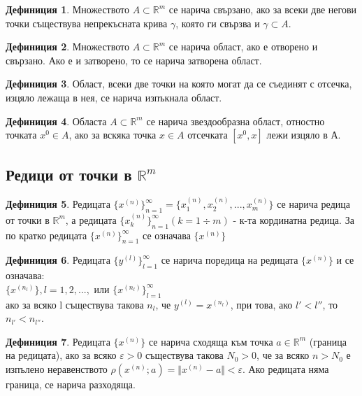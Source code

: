 \documentclass[a4paper,fleqn,12pt]{article}
\theoremstyle{definition}
\newtheorem{definition}{Дефиниция}[subsection]
\begin{document}
\begin{definition}
Множеството  $A \subset \mathbb{R}^m $ се нарича свързано,  ако за всеки две негови точки съществува непрекъсната крива $\gamma$, която ги свързва и $\gamma \subset A$.
\end{definition}

\begin{definition}
Множеството  $A \subset \mathbb{R}^m $ се нарича област, ако е отворено и свързано. Ако е и затворено, то се нарича затворена област. 
\end{definition}

\begin{definition}
Област, всеки две точки на която могат да се съединят с отсечка, изцяло лежаща в нея, се нарича изпъкнала област. 
\end{definition}

\begin{definition}
Областа $A \subset \mathbb{R}^m $ се нарича звездообразна област, отностно точката $x^0 \in A$, ако за вскяка точка $x \in A$ отсечката $[x^0,x]$ лежи изцяло в А. 
\end{definition}

\subsection{Редици от точки в $\mathbb{R}^m$}

\begin{definition}
Редицата $\{ x^{(n)} \}_{n = 1} ^ \infty = \{x_1 ^{(n)}, x_2 ^{(n)}, ... , x_m^{(n)}\} $ се нарича редица от точки в $\mathbb{R}^m$, а редицата $\{ x_k ^{(n)}\}_{n=1} ^ \infty ( k = 1 \div m) $ - к-та кординатна редица. За по кратко редицата $\{ x^{(n)} \}_{n = 1} ^ \infty$ се означава $\{ x^{(n)} \}$
\end{definition}

\begin{definition}
Редицата $\{ y^{(l)} \}_{l = 1} ^ \infty$ се нарича поредица на редицата $\{ x^{(n)} \}$ и се означава:\\
$\{ x^{(n_l)} \}, l = 1, 2, ..., $ или $\{ x^{(n_l)} \}_{l = 1} ^ \infty$\\
ако за всяко l съществува такова $n_l$, че $y^{(l)} = x^{(n_l)}$, при това, ако $l' < l'' $, то $n_{l'}<n_{l''}$.
\end{definition}

\begin{definition}
Редицата $\{ x^{(n)} \}$ се нарича сходяща към точка $a \in \mathbb{R}^m$ (граница на редицата), ако за всяко $\varepsilon > 0$ съществува такова $N_0 > 0$, че за всяко $n > N_0$ е изпълено неравенството $\rho(x^{(n)};a) = \Vert x^{(n)} - a \Vert < \varepsilon$. Ако редицата няма граница, се нарича разходяща. 
\end{definition}
\end{document}
